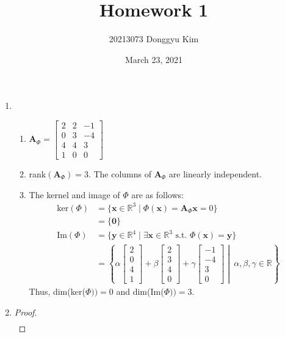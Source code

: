 \documentclass[11pt]{article}
\title{Homework 1}
\author{20213073 Donggyu Kim}
\date{March 23, 2021}
\begin{document}
\maketitle
\thispagestyle{fancy}

\begin{enumerate}
\item
    \begin{enumerate}
    \item
    $\bm A_\Phi=
    \begin{bmatrix}
        2 & 2 & -1 \\
        0 & 3 & -4 \\
        4 & 4 & 3 \\
        1 & 0 & 0
    \end{bmatrix}$ \\
    \item
    rank$(\bm A_\Phi)=3$.
    The columns of $\bm A_{\Phi}$ are linearly independent. \\
    \item The kernel and image of $\Phi$ are as follows:
    \begin{align*}
    \text{ker}(\Phi)
    & =\{\bm x\in\mathbb{R}^{3} \mid \Phi(\bm x)=\bm A_\Phi\bm x=0 \} \\
    & =\{\bm 0\} \\
    \text{Im}(\Phi)
    & =\{\bm y\in\mathbb{R}^{4} \mid \exists\bm x\in\mathbb{R}^{3} \text{ s.t. } \Phi(\bm x)=\bm y\}\\
    & =\left\{ \alpha\begin{bmatrix}2\\0\\4\\1\end{bmatrix}+
         \beta \begin{bmatrix}2\\3\\4\\0\end{bmatrix}+
         \gamma\begin{bmatrix}-1\\-4\\3\\0\end{bmatrix}
         \middle| \ \alpha,\beta,\gamma\in\mathbb{R} \right\}
    \end{align*}
    Thus, dim(ker($\Phi))=0$ and dim(Im($\Phi))=3$.
    \end{enumerate}
\item
    \begin{proof}\begin{align*}

\end{align*}
\end{proof}
\end{enumerate}
\end{document}

